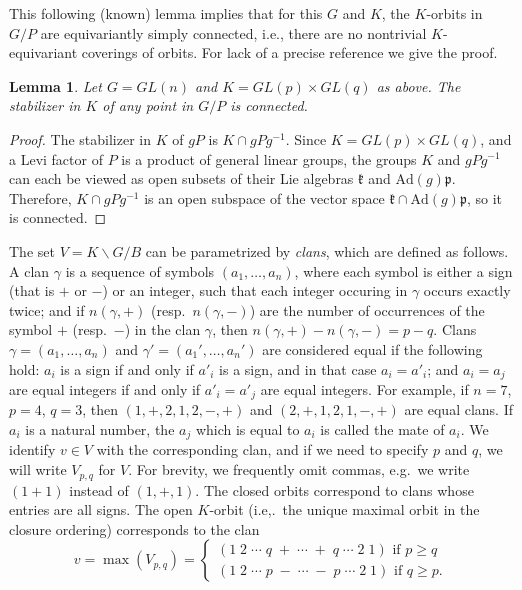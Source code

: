 \documentclass[11pt,letterpaper,reqno]{amsart}
\newcommand{\fk}{{\mathfrak k}}
\newcommand{\fp}{{\mathfrak p}}
\numberwithin{equation}{section}
\theoremstyle{plain}
\newtheorem{lemma}[theorem]{Lemma}
\theoremstyle{definition}
\theoremstyle{remark}
\newcommand{\Ad}{\mathrm{Ad}}
\begin{document}
This following (known) lemma implies that for this $G$ and $K$,
the $K$-orbits in $G/P$ are equivariantly simply connected, i.e., there are no nontrivial $K$-equivariant coverings of orbits.  
For lack of a precise reference we give the proof.

\begin{lemma} \label{l:equiv-sc}
Let $G = GL(n)$ and $K = GL(p) \times GL(q)$ as above.  The stabilizer in $K$ of any point in $G/P$ is connected.
\end{lemma}

\begin{proof}
The stabilizer in $K$ of $gP$ is $K \cap gPg^{-1}$.  Since $K = GL(p) \times GL(q)$, and a Levi factor of $P$ is a product of
general linear groups, the groups $K$ and $gPg^{-1}$ can each be viewed as open subsets of their Lie algebras $\fk$
and $\Ad(g) \fp$.  Therefore, $K \cap gPg^{-1}$ is an open subspace of the vector space $\fk \cap \Ad(g) \fp$, so it is connected.
\end{proof}



The set $V = K \backslash G/B$ can be parametrized by {\em clans}, which are defined as follows.
A clan $\gamma$ is a sequence of symbols $(a_1, \ldots, a_n)$, where each symbol is either a sign (that is $+$ or $-$) or an integer, such
that each integer occuring in $\gamma$ occurs exactly twice; and 
if $n(\gamma,+)$ (resp.~$n(\gamma,-)$) are the number of occurrences of the symbol $+$ (resp.~$-$) in the clan $\gamma$, then
$n(\gamma,+) - n(\gamma,-) = p-q$.  Clans $\gamma = (a_1, \ldots, a_n)$ and $\gamma' = (a_1', \ldots, a_n')$ are considered equal if
the following hold: $a_i$ is a sign if and only if $a'_i$ is a sign, and in that case $a_i = a'_i$; and  $a_i = a_j$ are equal integers if and only if
$a'_i = a'_j$ are equal integers.  For example, if $n = 7$, $p = 4$, $q = 3$, then
$(1,+,2,1,2,-,+)$ and $(2,+,1,2,1,-,+)$ are equal clans.  If $a_i$ is a natural number, the $a_j$ which is equal to $a_i$ is called the mate of $a_i$.  
We identify $v \in V$ with the corresponding clan,
and if we need to specify $p$ and $q$, we will write
$V_{p,q}$ for $V$.  
For brevity, we frequently omit commas, e.g.~we write $(1+1)$ instead of $(1,+,1)$.  The closed orbits correspond to clans whose entries are all signs.
The open $K$-orbit (i.e,.~the unique maximal orbit in the closure
ordering) corresponds to the clan
$$
v = \max(V_{p,q}) = \begin{cases}
(1\;2\;\cdots\;q\;+\;\cdots\;+\;q\;\cdots\;2\;1)  \mbox{  if  } p\geq q \\
(1\;2\;\cdots\;p\;-\;\cdots\;-\;p\;\cdots\;2\;1)   \mbox{ if } q\geq p.
\end{cases}
$$
\end{document}
